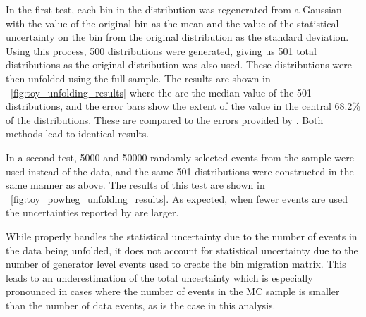In the first test, each bin in the \phistar distribution was regenerated from a
Gaussian with the value of the original bin as the mean and the value of the
statistical uncertainty on the bin from the original distribution as the
standard deviation. Using this process, \num{500} \phistar distributions were
generated, giving us \num{501} total distributions as the original distribution
was also used. These distributions were then unfolded using the full \MADGRAPH
sample. The results are shown in \FIG~\ref{fig:toy_unfolding_results} where the
 are the median value of the 501 distributions, and the
error bars show the extent of the value in the central 68.2\% of the
distributions. These are compared to the errors provided by \RooUnfold. Both
methods lead to identical results.


In a second test, \num{5000} and \num{50000} randomly selected events from the
\POWHEG sample were used instead of the data, and the same 501 distributions
were constructed in the same manner as above. The results of this test are
shown in \FIG~\ref{fig:toy_powheg_unfolding_results}. As expected, when fewer
events are used the uncertainties reported by \RooUnfold are larger.


While \RooUnfold properly handles the statistical uncertainty due to the number
of events in the data being unfolded, it does not account for statistical
uncertainty due to the number of generator level events used to create the
bin migration matrix. This leads to an underestimation of the total uncertainty
which is especially pronounced in cases where the number of events in the
MC sample is smaller than the number of data events, as is the case in this
analysis.

